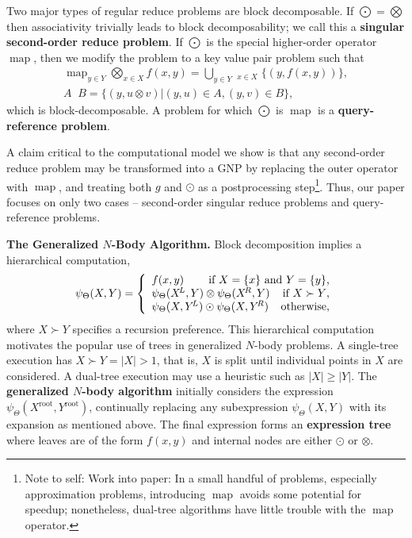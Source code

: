 \documentclass[times, leqno,twocolumn]{article}
\newcommand{\authornote}[1]{\footnote{Note to self: #1}}
\newcommand{\authorsnote}[1]{\authornote{#1}}
\newcommand{\Union}{\bigcup}
\newcommand{\bigvec}[1]{\mathop{\overrightarrow{#1}}}
\newcommand{\prefsplit}[2]{#1 \succ #2}
\DeclareMathOperator*{\map}{map}
\newcommand{\gnp}{\psi_{\Theta}}
\newcommand{\defterm}[1]{{\bf #1}}
\newcommand{\kdroot}[1]{#1^{\text{root}}}
\newcommand{\kdleft}[1]{#1^{\!L}}
\newcommand{\kdright}[1]{#1^{\!R}}
\begin{document}
Two major types of regular reduce problems are block decomposable.
If $\bigodot = \bigotimes$ then associativity trivially leads to block decomposability; we call this a \defterm{singular second-order reduce problem}.
If $\bigodot$ is the special higher-order operator $\map$, then we modify the problem to a key value pair problem such that
\[\begin{array}{c}
  \displaystyle \map_{y \in Y} \bigotimes_{x \in X} f(x, y) = \Union_{y \in Y} \bigvec{\bigotimes}_{x \in X} \{(y, f(x, y))\},
  \\
  A \bigvec{\otimes} B = \{(y, u \otimes v) | (y,u) \in A, (y,v) \in B\},
\end{array}\]
\noindent which is block-decomposable.
A problem for which $\bigodot$ is $\map$ is a \defterm{query-reference problem}.

A claim critical to the computational model we show is that any second-order reduce problem may be transformed into a GNP by replacing the outer operator with $\map$, and treating both $g$ and $\odot$ as a postprocessing step\authorsnote{Work into paper: In a small handful of problems, especially approximation problems, introducing $\map$ avoids some potential for speedup; nonetheless, dual-tree algorithms have little trouble with the $\map$ operator.}.
Thus, our paper focuses on only two cases -- second-order singular reduce problems and query-reference problems.

{\bf The Generalized $N$-Body Algorithm.}
Block decomposition implies a hierarchical computation,
\[
\gnp(X,Y) = \left\{ \begin{array}{lrr}
    f(x,y) & \multicolumn{2}{r}{\text{if }X = \{x\}\text{ and }Y = \{y\}\text{,}}
    \\
    \multicolumn{2}{l}{\gnp(\kdleft{X},Y) \otimes \gnp(\kdright{X}, Y)} & \text{if }\prefsplit{X}{Y}\text{,}
    \\
    \multicolumn{2}{l}{\gnp(X,\kdleft{Y}) \odot \gnp(X,\kdright{Y})} & \text{otherwise,}
  \end{array}
\right.
\]
\noindent where $\prefsplit{X}{Y}$ specifies a recursion preference.
This hierarchical computation motivates the popular use of trees in generalized $N$-body problems.
A single-tree execution has $\prefsplit{X}{Y} = |X| > 1$, that is, $X$ is split until individual points in $X$ are considered.
A dual-tree execution may use a heuristic such as $|X| \geq |Y|$.
The \defterm{generalized $N$-body algorithm} initially considers the expression $\gnp(\kdroot{X}, \kdroot{Y})$, continually replacing any subexpression $\gnp(X, Y)$ with its expansion as mentioned above.
The final expression forms an \defterm{expression tree} where leaves are of the form $f(x,y)$ and internal nodes are either $\odot$ or $\otimes$.
\end{document}
